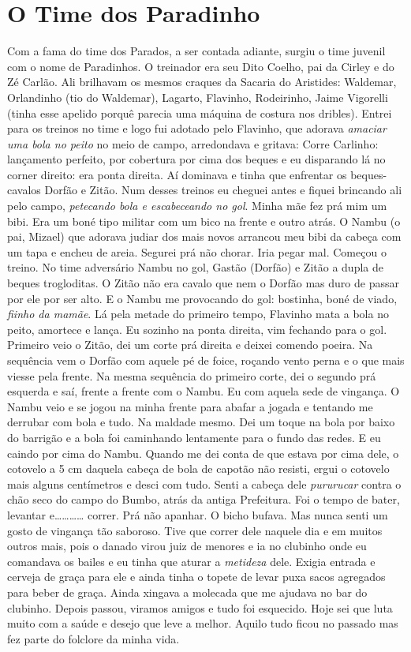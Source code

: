 \documentclass[12pt,brazil,]{book}
\begin{document}
\section{O Time dos Paradinho}\label{o-time-dos-paradinho}

Com a fama do time dos Parados, a ser contada adiante, surgiu o time
juvenil com o nome de Paradinhos. O treinador era seu Dito Coelho, pai
da Cirley e do Zé Carlão. Ali brilhavam os mesmos craques da Sacaria do
Aristides: Waldemar, Orlandinho (tio do Waldemar), Lagarto, Flavinho,
Rodeirinho, Jaime Vigorelli (tinha esse apelido porquê parecia uma
máquina de costura nos dribles). Entrei para os treinos no time e logo
fui adotado pelo Flavinho, que adorava \emph{amaciar uma bola no peito}
no meio de campo, arredondava e gritava: Corre Carlinho: lançamento
perfeito, por cobertura por cima dos beques e eu disparando lá no corner
direito: era ponta direita. Aí dominava e tinha que enfrentar os
beques-cavalos Dorfão e Zitão. Num desses treinos eu cheguei antes e
fiquei brincando ali pelo campo, \emph{petecando bola e escabeceando no
gol}. Minha mãe fez prá mim um bibi. Era um boné tipo militar com um
bico na frente e outro atrás. O Nambu (o pai, Mizael) que adorava judiar
dos mais novos arrancou meu bibi da cabeça com um tapa e encheu de
areia. Segurei prá não chorar. Iria pegar mal. Começou o treino. No time
adversário Nambu no gol, Gastão (Dorfão) e Zitão a dupla de beques
trogloditas. O Zitão não era cavalo que nem o Dorfão mas duro de passar
por ele por ser alto. E o Nambu me provocando do gol: bostinha, boné de
viado, \emph{fiinho da mamãe}. Lá pela metade do primeiro tempo,
Flavinho mata a bola no peito, amortece e lança. Eu sozinho na ponta
direita, vim fechando para o gol. Primeiro veio o Zitão, dei um corte
prá direita e deixei comendo poeira. Na sequência vem o Dorfão com
aquele pé de foice, roçando vento perna e o que mais viesse pela frente.
Na mesma sequência do primeiro corte, dei o segundo prá esquerda e saí,
frente a frente com o Nambu. Eu com aquela sede de vingança. O Nambu
veio e se jogou na minha frente para abafar a jogada e tentando me
derrubar com bola e tudo. Na maldade mesmo. Dei um toque na bola por
baixo do barrigão e a bola foi caminhando lentamente para o fundo das
redes. E eu caindo por cima do Nambu. Quando me dei conta de que estava
por cima dele, o cotovelo a 5 cm daquela cabeça de bola de capotão não
resisti, ergui o cotovelo mais alguns centímetros e desci com tudo.
Senti a cabeça dele \emph{pururucar} contra o chão seco do campo do
Bumbo, atrás da antiga Prefeitura. Foi o tempo de bater, levantar
e\ldots{}\ldots{}\ldots{}\ldots{} correr. Prá não apanhar. O bicho
bufava. Mas nunca senti um gosto de vingança tão saboroso. Tive que
correr dele naquele dia e em muitos outros mais, pois o danado virou
juiz de menores e ia no clubinho onde eu comandava os bailes e eu tinha
que aturar a \emph{metideza} dele. Exigia entrada e cerveja de graça
para ele e ainda tinha o topete de levar puxa sacos agregados para beber
de graça. Ainda xingava a molecada que me ajudava no bar do clubinho.
Depois passou, viramos amigos e tudo foi esquecido. Hoje sei que luta
muito com a saúde e desejo que leve a melhor. Aquilo tudo ficou no
passado mas fez parte do folclore da minha vida.
\end{document}
